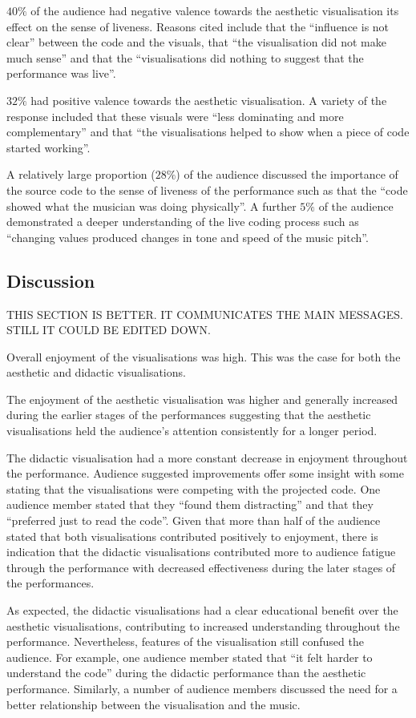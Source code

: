 \documentclass{sig-alternate}
\begin{document}
$40\%$ of the audience had negative valence towards the aesthetic visualisation its effect on the sense of liveness. Reasons cited include that the ``influence is not clear'' between the code and the visuals, that ``the visualisation did not make much sense'' and that the ``visualisations did nothing to suggest that the performance was live''.

$32\%$ had positive valence towards the aesthetic visualisation. A variety of the response included that these visuals were ``less dominating and more complementary'' and that ``the visualisations helped to show when a piece of code started working''.

A relatively large proportion ($28\%$) of the audience discussed the importance of the source code to the sense of liveness of the performance such as that the ``code showed what the musician was doing physically''. A further $5\%$ of the audience demonstrated a deeper understanding of the live coding process such as ``changing values produced changes in tone and speed of the music pitch''.

\subsection{Discussion}

THIS SECTION IS BETTER. IT COMMUNICATES THE MAIN MESSAGES. STILL IT COULD BE EDITED DOWN.

Overall enjoyment of the visualisations was high. This was the case for both the aesthetic and didactic visualisations.

The enjoyment of the aesthetic visualisation was higher and generally increased during the earlier stages of the performances suggesting that the aesthetic visualisations held the audience's attention consistently for a longer period.

The didactic visualisation had a more constant decrease in enjoyment throughout the performance. Audience suggested improvements offer some insight with some stating that the visualisations were competing with the projected code. One audience member stated that they ``found them distracting'' and that they ``preferred just to read the code''. Given that more than half of the audience stated that both visualisations contributed positively to enjoyment, there is indication that the didactic visualisations contributed more to audience fatigue through the performance with decreased effectiveness during the later stages of the performances.

As expected, the didactic visualisations had a clear educational benefit over the aesthetic visualisations, contributing to increased understanding throughout the performance. Nevertheless, features of the visualisation still confused the audience. For example, one audience member stated that ``it felt harder to understand the code'' during the didactic performance than the aesthetic performance. Similarly, a number of audience members discussed the need for a better relationship between the visualisation and the music.
\end{document}
